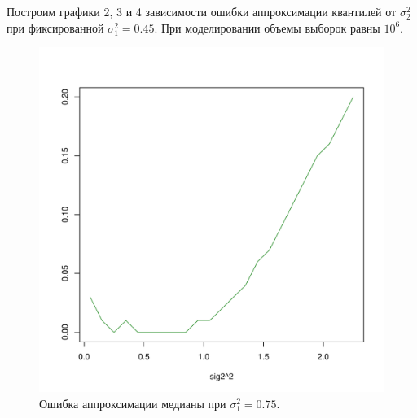 \documentclass[12pt]{article}
\begin{document}
	
	
	Построим графики 2, 3 и 4 зависимости ошибки аппроксимации квантилей от $\sigma_{2}^{2}$ при фиксированной $\sigma_{1}^{2} = 0.45$. При моделировании объемы выборок равны $10^{6}$.
	
	\begin{figure}[!hhh]
		\begin{center}
			\begin{minipage}[h]{0.8\linewidth}
				\includegraphics[width=1\linewidth]{img/gr_neww_1.pdf}
				\caption{Ошибка аппроксимации медианы при $\sigma_{1}^{2} = 0.75$.} %
				\label{ris7} %
			\end{minipage}	
		\end{center}
	\end{figure}
\end{document}

